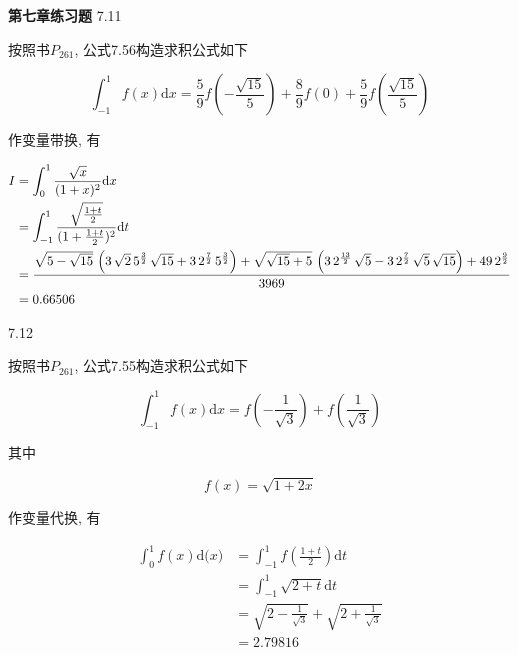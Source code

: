 \documentclass[a4paper, 10pt]{article}
\newcommand{\ud}[1]{\mathrm{d} {#1}}
\begin{document}
\begin{CJK}{UTF8}{gbsn}

\textbf{第七章练习题}
7.11

按照书$P_{261}$, 公式7.56构造求积公式如下

\begin{equation*}
	\int_{-1}^{1}f(x)\ud{x} = \frac{5}{9}f(-\frac{\sqrt{15}}{5})+\frac{8}{9}f(0)+\frac{5}{9}f(\frac{\sqrt{15}}{5})
\end{equation*}

作变量带换, 有

\begin{align*}
	I & = \int_{0}^{1}\frac{\sqrt{x}}{(1+x)^2}\ud{x} \\
	  & = \int_{-1}^{1}\frac{\sqrt{\frac{1+t}{2}}}{(1+\frac{1+t}{2})^2}\ud{t} \\
	  & = {{\sqrt{5-\sqrt{15}}\,\left(3\,\sqrt{2}\,5^{{{3}\over{2}}}\,\sqrt{15}+3\,2^{{{7}\over{2}}}\,5^{{{3}\over{2}}}\right)+\sqrt{\sqrt{15}+5}\,\left(3\,2^{{{13}\over{2}}}\,\sqrt{5}-3\,2^{{{7}\over{2}}}\,\sqrt{5}\,\sqrt{15}\right)+49\,2^{{{9}\over{2}}}}\over{3969}} \\
	  & = 0.66506
\end{align*}

7.12

按照书$P_{261}$, 公式7.55构造求积公式如下

\begin{equation*}
	\int_{-1}^{1}f(x)\ud{x} = f(-\frac{1}{\sqrt{3}})+f(\frac{1}{\sqrt{3}})
\end{equation*}




其中

\begin{equation*}
	f(x) = \sqrt{1+2x}
\end{equation*}

作变量代换, 有

\begin{align*}
	\int_{0}^{1}f(x)\ud(x) & = \int_{-1}^{1}f(\frac{1+t}{2})\ud{t} \\
						   & = \int_{-1}^{1}\sqrt{2+t}\ud{t} \\
						   & = \sqrt{2-\frac{1}{\sqrt{3}}} + \sqrt{2+\frac{1}{\sqrt{3}}} \\
						   & = 2.79816
\end{align*}




\end{CJK}
\end{document}
